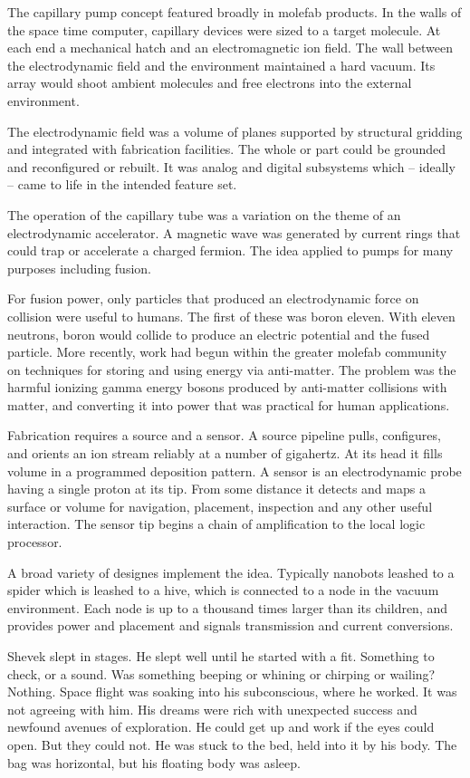 The capillary pump concept featured broadly in molefab products.  In
the walls of the space time computer, capillary devices were sized to
a target molecule.  At each end a mechanical hatch and an
electromagnetic ion field.  The wall between the electrodynamic field
and the environment maintained a hard vacuum.  Its array would shoot
ambient molecules and free electrons into the external environment.

The electrodynamic field was a volume of planes supported by
structural gridding and integrated with fabrication facilities.  The
whole or part could be grounded and reconfigured or rebuilt.  It was
analog and digital subsystems which -- ideally -- came to life in the
intended feature set.

The operation of the capillary tube was a variation on the theme of an
electrodynamic accelerator.  A magnetic wave was generated by current
rings that could trap or accelerate a charged fermion.  The idea
applied to pumps for many purposes including fusion.

For fusion power, only particles that produced an electrodynamic force
on collision were useful to humans.  The first of these was boron
eleven.  With eleven neutrons, boron would collide to produce an
electric potential and the fused particle.  More recently, work had
begun within the greater molefab community on techniques for storing
and using energy via anti-matter.  The problem was the harmful
ionizing gamma energy bosons produced by anti-matter collisions with
matter, and converting it into power that was practical for human
applications.

Fabrication requires a source and a sensor.  A source pipeline pulls,
configures, and orients an ion stream reliably at a number of
gigahertz.  At its head it fills volume in a programmed deposition
pattern.  A sensor is an electrodynamic probe having a single proton
at its tip.  From some distance it detects and maps a surface or
volume for navigation, placement, inspection and any other useful
interaction.  The sensor tip begins a chain of amplification to the
local logic processor.

A broad variety of designes implement the idea.  Typically nanobots
leashed to a spider which is leashed to a hive, which is connected to
a node in the vacuum environment.  Each node is up to a thousand times
larger than its children, and provides power and placement and signals
transmission and current conversions.

Shevek slept in stages.  He slept well until he started with a fit.
Something to check, or a sound.  Was something beeping or whining or
chirping or wailing?  Nothing.  Space flight was soaking into his
subconscious, where he worked.  It was not agreeing with him.  His
dreams were rich with unexpected success and newfound avenues of
exploration.  He could get up and work if the eyes could open.  But
they could not.  He was stuck to the bed, held into it by his body.
The bag was horizontal, but his floating body was asleep.

